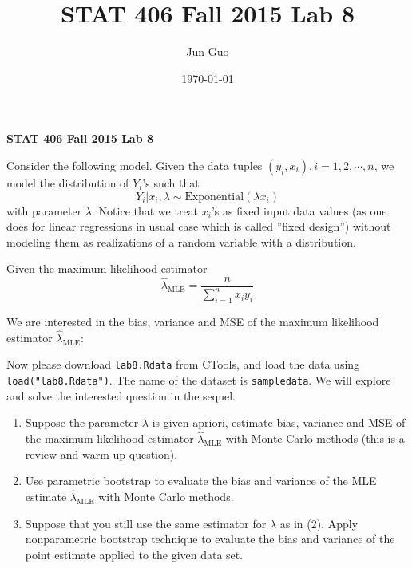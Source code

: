 \documentclass[letter,10.5pt]{article}
\title{\textbf{STAT 406 Fall 2015 Lab 8}}
\author{Jun Guo}
\date{\today}
\numberwithin{equation}{subsection}
\begin{document}
\begin{center}
\large
\textbf{STAT 406 Fall 2015 Lab 8}
\end{center}\vspace*{5mm}

Consider the following model. Given the data tuples $(y_i,x_i), i=1,2,\cdots,n$, we model the distribution of $Y_i$'s such that $$Y_i|x_i,\lambda \sim \text{Exponential}(\lambda x_i)$$ with parameter $\lambda$. Notice that we treat $x_i$'s as fixed input data values (as one does for linear regressions in usual case which is called ''fixed design'') without modeling them as realizations of a random variable with a distribution. \newline

Given the maximum likelihood estimator $$\widehat{\lambda}_{\text{MLE}} = \frac{n}{\sum_{i=1}^n x_iy_i}$$

We are interested in the bias, variance and MSE of the maximum likelihood estimator $\widehat{\lambda}_{\text{MLE}} $: \newline

Now please download \texttt{lab8.Rdata} from CTools, and load the data using \texttt{load("lab8.Rdata")}. The name of the dataset is \texttt{sampledata}. We will explore and solve the interested question in the sequel. 
\begin{enumerate}
\item Suppose the parameter $\lambda$ is given apriori, estimate bias, variance and MSE of the maximum likelihood estimator $\widehat{\lambda}_{\text{MLE}}$ with Monte Carlo methods (this is a review and warm up question).
\item Use parametric bootstrap to evaluate the bias and variance of the MLE estimate $\widehat{\lambda}_{\text{MLE}}$ with Monte Carlo methods.
\item Suppose that you still use the same estimator for $\lambda$ as in (2). Apply nonparametric bootstrap technique to evaluate the bias and variance of the point estimate applied to the given data set. 
\end{enumerate}
\end{document}
